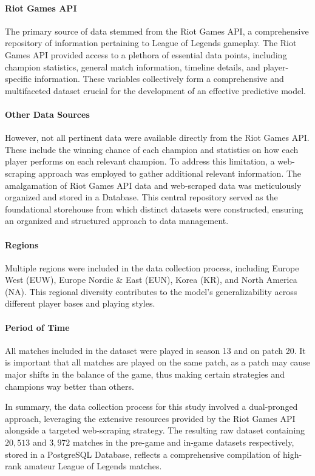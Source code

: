 \documentclass[12pt, a4paper, headinclude, twoside, plainheadsepline, open=right, numbers=noenddot, hidelinks, toc=listof, toc=bibliography]{scrreprt}
\begin{document}
\paragraph{Riot Games API}
The primary source of data stemmed from the Riot Games API, a comprehensive repository of information pertaining to League of Legends gameplay.
The Riot Games API provided access to a plethora of essential data points, including champion statistics, general match information, timeline details, and player-specific information.
These variables collectively form a comprehensive and multifaceted dataset crucial for the development of an effective predictive model.
\paragraph{Other Data Sources}
However, not all pertinent data were available directly from the Riot Games API.
These include the winning chance of each champion and statistics on how each player performs on each relevant champion.
To address this limitation, a web-scraping approach was employed to gather additional relevant information. The amalgamation of Riot Games API data and web-scraped data was meticulously organized and stored in a Database.
This central repository served as the foundational storehouse from which distinct datasets were constructed, ensuring an organized and structured approach to data management.
\paragraph{Regions}
Multiple regions were included in the data collection process, including Europe West (EUW), Europe Nordic \& East (EUN), Korea (KR), and North America (NA).
This regional diversity contributes to the model's generalizability across different player bases and playing styles.
\paragraph{Period of Time}
All matches included in the dataset were played in season 13 and on patch 20.
It is important that all matches are played on the same patch, as a patch may cause major shifts in the balance of the game, thus making certain strategies and champions way better than others.

In summary, the data collection process for this study involved a dual-pronged approach, leveraging the extensive resources provided by the Riot Games API alongside a targeted web-scraping strategy.
The resulting raw dataset containing $20,513$ and  $3,972$ matches in the pre-game and in-game datasets respectively, stored in a PostgreSQL Database, reflects a comprehensive compilation of high-rank amateur League of Legends matches.
\end{document}
